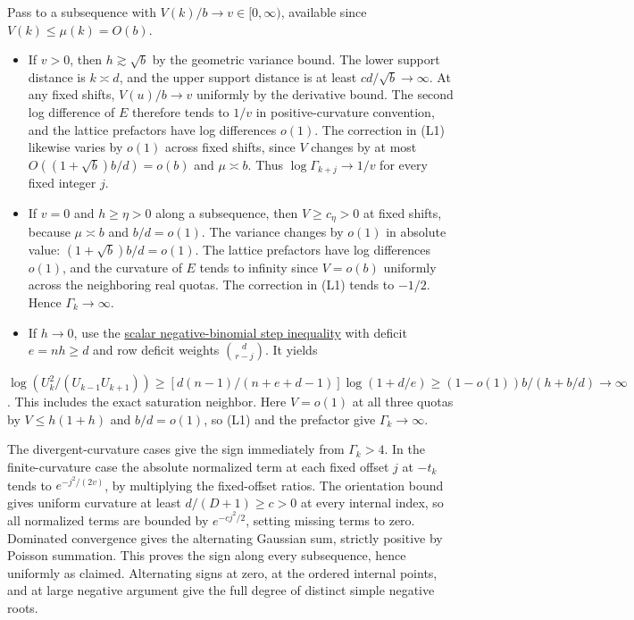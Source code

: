 Pass to a subsequence with $V(k)/b\to v\in[0,\infty)$, available since $V(k)\le\mu(k)=O(b)$.

\begin{itemize}
\item If $v>0$, then $h\gtrsim\sqrt b$ by the geometric variance bound. The lower support distance is $k\asymp d$, and the upper support distance is at least $c d/\sqrt b\to\infty$. At any fixed shifts, $V(u)/b\to v$ uniformly by the derivative bound. The second log difference of $E$ therefore tends to $1/v$ in positive-curvature convention, and the lattice prefactors have log differences $o(1)$. The correction in (L1) likewise varies by $o(1)$ across fixed shifts, since $V$ changes by at most $O((1+\sqrt b)b/d)=o(b)$ and $\mu\asymp b$. Thus $\log\Gamma_{k+j}\to1/v$ for every fixed integer $j$.
\item If $v=0$ and $h\ge\eta>0$ along a subsequence, then $V\ge c_\eta>0$ at fixed shifts, because $\mu\asymp b$ and $b/d=o(1)$. The variance changes by $o(1)$ in absolute value: $(1+\sqrt b)b/d=o(1)$. The lattice prefactors have log differences $o(1)$, and the curvature of $E$ tends to infinity since $V=o(b)$ uniformly across the neighboring real quotas. The correction in (L1) tends to $-1/2$. Hence $\Gamma_k\to\infty$.
\item If $h\to0$, use the \href{https://github.com/ProgramComputer/open-math-research/blob/04564a728c21eab6ce511b98a48ccaac754648ff/topics/balanced-arrays/very-tall/very-tall-upper-quota.md#the-last-od-quotas}{scalar negative-binomial step inequality} with deficit $e=nh\ge d$ and row deficit weights $\binom d{r-j}$. It yields
\end{itemize}
  $\log(U_k^2/(U_{k-1}U_{k+1}))\ge[d(n-1)/(n+e+d-1)]\log(1+d/e)\ge(1-o(1))b/(h+b/d)\to\infty$.
  This includes the exact saturation neighbor. Here $V=o(1)$ at all three quotas by $V\le h(1+h)$ and $b/d=o(1)$, so (L1) and the prefactor give $\Gamma_k\to\infty$.

The divergent-curvature cases give the sign immediately from $\Gamma_k>4$. In the finite-curvature case the absolute normalized term at each fixed offset $j$ at $-t_k$ tends to $e^{-j^2/(2v)}$, by multiplying the fixed-offset ratios. The orientation bound gives uniform curvature at least $d/(D+1)\ge c>0$ at every internal index, so all normalized terms are bounded by $e^{-c j^2/2}$, setting missing terms to zero. Dominated convergence gives the alternating Gaussian sum, strictly positive by Poisson summation. This proves the sign along every subsequence, hence uniformly as claimed. Alternating signs at zero, at the ordered internal points, and at large negative argument give the full degree of distinct simple negative roots.

